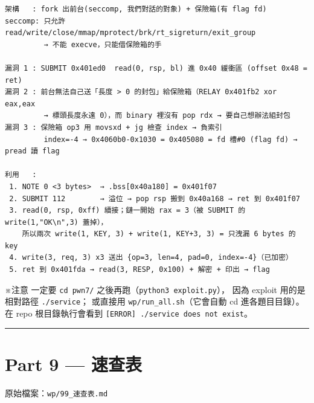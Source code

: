 \documentclass[10pt,a4paper]{article}
\renewenvironment{quote}{%
  \begin{mdframed}[linewidth=0pt,innerleftmargin=0pt,innerrightmargin=0pt,
    innerbottommargin=0pt,innertopmargin=0pt,skipabove=0.55em,skipbelow=0.55em,
    leftmargin=0.9em,rightmargin=0.4em,startcode={\color{quotebar}\vrule width 2.6pt},%
    endcode={}]%
  \itshape\color{black}%
}{%
  \end{mdframed}%
}
\begin{document}
\begin{Verbatim}[breaklines=true,breakanywhere=true,breakautoindent=false,fontsize=\fontsize{7.0}{9.5}\selectfont]
架構   : fork 出前台(seccomp, 我們對話的對象) + 保險箱(有 flag fd)
seccomp: 只允許 read/write/close/mmap/mprotect/brk/rt_sigreturn/exit_group
         → 不能 execve，只能借保險箱的手

漏洞 1 : SUBMIT 0x401ed0  read(0, rsp, bl) 進 0x40 緩衝區 (offset 0x48 = ret)
漏洞 2 : 前台無法自己送「長度 > 0 的封包」給保險箱（RELAY 0x401fb2 xor eax,eax
         → 標頭長度永遠 0），而 binary 裡沒有 pop rdx → 要自己想辦法組封包
漏洞 3 : 保險箱 op3 用 movsxd + jg 檢查 index → 負索引
         index=-4 → 0x4060b0-0x1030 = 0x405080 = fd 槽#0 (flag fd) → pread 讀 flag

利用   :
 1. NOTE 0 <3 bytes>  → .bss[0x40a180] = 0x401f07
 2. SUBMIT 112        → 溢位 → pop rsp 搬到 0x40a168 → ret 到 0x401f07
 3. read(0, rsp, 0xff) 續接；鏈一開始 rax = 3（被 SUBMIT 的 write(1,"OK\n",3) 蓋掉），
    所以兩次 write(1, KEY, 3) + write(1, KEY+3, 3) = 只洩漏 6 bytes 的 key
 4. write(3, req, 3) x3 送出 {op=3, len=4, pad=0, index=-4}（已加密）
 5. ret 到 0x401fda → read(3, RESP, 0x100) + 解密 + 印出 → flag
\end{Verbatim}

\begin{quote}
※注意 一定要 \texttt{cd\ \allowbreak{}pwn7/}
之後再跑（\texttt{python3\ \allowbreak{}exploit.\allowbreak{}py}）， 因為 exploit 用的是相對路徑
\texttt{./\allowbreak{}service}； 或直接用 \texttt{wp/\allowbreak{}run\_\allowbreak{}all.\allowbreak{}sh}（它會自動 cd
進各題目目錄）。 在 repo 根目錄執行會看到
\texttt{{[}ERROR{]}\ \allowbreak{}\textquotesingle{}\allowbreak{}./\allowbreak{}service\textquotesingle{}\allowbreak{}\ \allowbreak{}does\ \allowbreak{}not\ \allowbreak{}exist}。
\end{quote}

\begin{center}\rule{0.5\linewidth}{0.5pt}\end{center}

\section{Part 9 --- 速查表}\label{part-9-ux901fux67e5ux8868}

\begin{quote}
原始檔案：\texttt{wp/\allowbreak{}99\_\allowbreak{}速查表.\allowbreak{}md}
\end{quote}
\end{document}
